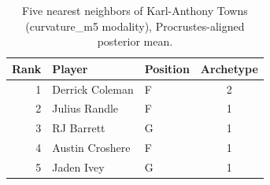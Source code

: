 \begin{table}[htbp]
  \centering\small
  \begin{tabular}{rllc}
    \toprule
    Rank & Player & Position & Archetype \\
    \midrule
    1 & Derrick Coleman & F & 2 \\
    2 & Julius Randle & F & 1 \\
    3 & RJ Barrett & G & 1 \\
    4 & Austin Croshere & F & 1 \\
    5 & Jaden Ivey & G & 1 \\
    \bottomrule
  \end{tabular}
  \caption{Five nearest neighbors of Karl-Anthony Towns (curvature_m5 modality), Procrustes-aligned posterior mean.}
  \label{tab:Karl_Anthony_Towns_neighbors_curvature_m5}
\end{table}

